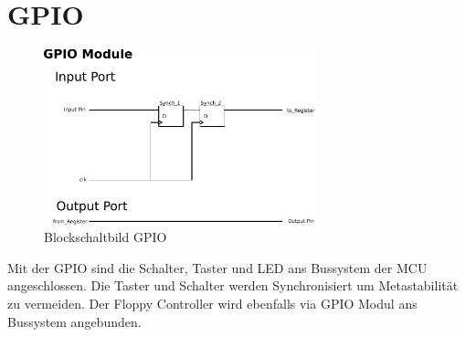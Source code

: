 \section{GPIO}
\begin{figure}[h!]
    \centering
    \includegraphics[width=0.7\textwidth]{../organization/GPIO.pdf}
    \caption{Blockschaltbild GPIO}
    \label{fig:block}
\end{figure}
\noindent Mit der GPIO sind die Schalter, Taster und LED ans Bussystem der MCU 
angeschlossen. Die Taster und Schalter werden Synchronisiert um Metastabilität 
zu vermeiden. Der Floppy Controller wird ebenfalls via GPIO Modul ans 
Bussystem angebunden. 
